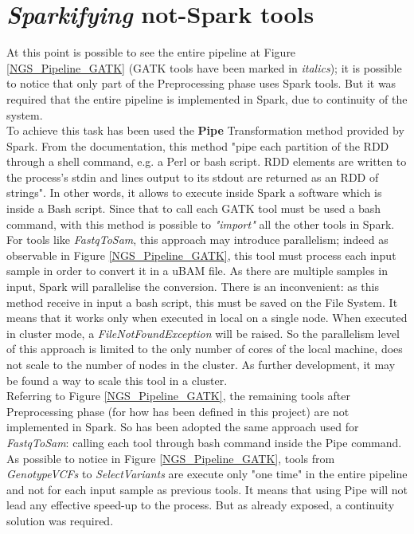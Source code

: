 \section{\textit{Sparkifying} not-Spark tools}
At this point is possible to see the entire pipeline at Figure \ref{NGS_Pipeline_GATK} (GATK tools have been marked in \textit{italics}); it is possible to notice that only part of the Preprocessing phase uses Spark tools. But it was required that the entire pipeline is implemented in Spark, due to continuity of the system.
\\[1\baselineskip]
To achieve this task has been used the \textbf{Pipe} Transformation method provided by Spark. From the documentation, this method "pipe each partition of the RDD through a shell command, e.g. a Perl or bash script. RDD elements are written to the process's stdin and lines output to its stdout are returned as an RDD of strings". In other words, it allows to execute inside Spark a software which is inside a Bash script. Since that to call each GATK tool must be used a bash command, with this method is possible to \textit{"import"} all the other tools in Spark.
\\[1\baselineskip]
For tools like \textit{FastqToSam}, this approach may introduce parallelism; indeed as observable in Figure \ref{NGS_Pipeline_GATK}, this tool must process each input sample in order to convert it in a uBAM file. As there are multiple samples in input, Spark will parallelise the conversion.\newline
There is an inconvenient: as this method receive in input a bash script, this must be saved on the File System. It means that it works only when executed in local on a single node. When executed in cluster mode, a \textit{FileNotFoundException} will be raised. So the parallelism level of this approach is limited to the only number of cores of the local machine, does not scale to the number of nodes in the cluster. As further development, it may be found a way to scale this tool in a cluster.
\\[1\baselineskip]
Referring to Figure \ref{NGS_Pipeline_GATK}, the remaining tools after Preprocessing phase (for how has been defined in this project) are not implemented in Spark. So has been adopted the same approach used for \textit{FastqToSam}: calling each tool through bash command inside the Pipe command. As possible to notice in Figure \ref{NGS_Pipeline_GATK}, tools from \textit{GenotypeVCFs} to \textit{SelectVariants} are execute only "one time" in the entire pipeline and not for each input sample as previous tools. It means that using Pipe will not lead any effective speed-up to the process. But as already exposed, a continuity solution was required.
